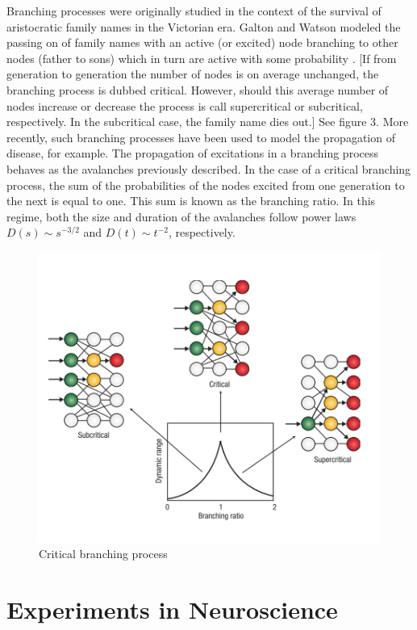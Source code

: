 \documentclass[12pt]{article}
\begin{document}
Branching processes were originally studied in the context of the survival of aristocratic family names in the Victorian era. Galton and Watson modeled the passing on of family names with an active (or excited) node branching to other nodes (father to sons) which in turn are active with some probability \cite{Watson2014}. [If from generation to generation the number of nodes is on average unchanged, the branching process is dubbed critical. However, should this average number of nodes increase or decrease the process is call supercritical or subcritical, respectively. In the subcritical case, the family name dies out.] See figure 3. More recently, such branching processes have been used to model the propagation of disease, for example. The propagation of excitations in a branching process behaves as the avalanches previously described. In the case of a critical branching process, the sum of the probabilities of the nodes excited from one generation to the next is equal to one. This sum is known as the branching ratio. In this regime, both the size and duration of the avalanches follow power laws $ D(s) \sim s^{-3/2} $ and $ D(t) \sim t^{-2} $, respectively. \cite{Larremore2014}

\begin{figure}      
  \begin{center}    
 \includegraphics[width=.65\textwidth]{Branchingprocesschialvo}    
    \caption{Critical branching process \cite{Chialvo2006a}}   
   \label{Figure::Critical Branching Process}   
  \end{center}     
   \end{figure}

\section*{Experiments in Neuroscience}
\end{document}
